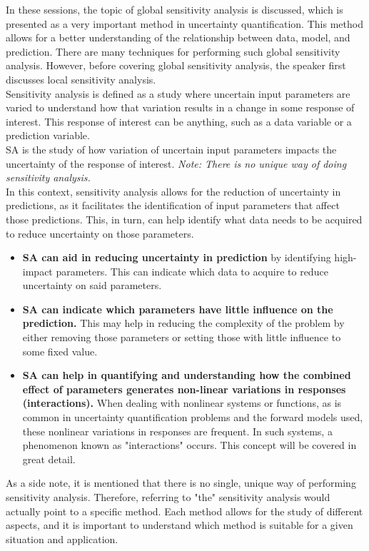 In these sessions, the topic of global sensitivity analysis is discussed, which is presented as a very important method in uncertainty quantification.\noindent
 This method allows for a better understanding of the relationship between data, model, and prediction. There are many techniques for performing such global sensitivity analysis. However, before covering global sensitivity analysis, the speaker first discusses local sensitivity analysis.
\\
\noindent
Sensitivity analysis is defined as a study where uncertain input parameters are varied to understand how that variation results in a change in some response of interest. This response of interest can be anything, such as a data variable or a prediction variable.
\\
\noindent
SA is the study of how variation of uncertain input parameters impacts the uncertainty of the response of interest.
\noindent
\textit{Note: There is no unique way of doing sensitivity analysis.}
\\
\noindent
In this context, sensitivity analysis allows for the reduction of uncertainty in predictions, as it facilitates the identification of input parameters that affect those predictions. This, in turn, can help identify what data needs to be acquired to reduce uncertainty on those parameters.

\begin{itemize}
    \item \textbf{SA can aid in reducing uncertainty in prediction} by identifying high-impact parameters. This can indicate which data to acquire to reduce uncertainty on said parameters.
    \item \textbf{SA can indicate which parameters have little influence on the prediction.} This may help in reducing the complexity of the problem by either removing those parameters or setting those with little influence to some fixed value.
    \item \textbf{SA can help in quantifying and understanding how the combined effect of parameters generates non-linear variations in responses (interactions).} When dealing with nonlinear systems or functions, as is common in uncertainty quantification problems and the forward models used, these nonlinear variations in responses are frequent. In such systems, a phenomenon known as "interactions" occurs. This concept will be covered in great detail.
\end{itemize}
\noindent
As a side note, it is mentioned that there is no single, unique way of performing sensitivity analysis. Therefore, referring to "the" sensitivity analysis would actually point to a specific method. Each method allows for the study of different aspects, and it is important to understand which method is suitable for a given situation and application.


